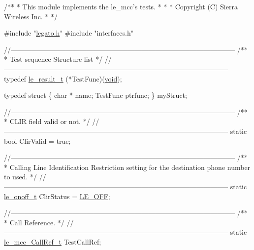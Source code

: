 
\begin{DoxyCodeInclude}
\textcolor{comment}{ /**}
\textcolor{comment}{  * This module implements the le\_mcc's tests.}
\textcolor{comment}{  *}
\textcolor{comment}{  *}
\textcolor{comment}{  * Copyright (C) Sierra Wireless Inc.}
\textcolor{comment}{  *}
\textcolor{comment}{  */}

\textcolor{preprocessor}{#include "\hyperlink{legato_8h}{legato.h}"}
\textcolor{preprocessor}{#include "interfaces.h"}


\textcolor{comment}{//--------------------------------------------------------------------------------------------------}\textcolor{comment}{}
\textcolor{comment}{/**}
\textcolor{comment}{ * Test sequence Structure list}
\textcolor{comment}{ */}
\textcolor{comment}{//--------------------------------------------------------------------------------------------------}
\textcolor{keyword}{typedef} \hyperlink{le__basics_8h_a1cca095ed6ebab24b57a636382a6c86c}{le\_result\_t} (*TestFunc)(\hyperlink{_t_e_m_p_l_a_t_e__interface_8h_ac9c84fa68bbad002983e35ce3663c686}{void});

\textcolor{keyword}{typedef} \textcolor{keyword}{struct}
\{
        \textcolor{keywordtype}{char} * name;
        TestFunc ptrfunc;
\} myStruct;

\textcolor{comment}{//--------------------------------------------------------------------------------------------------}\textcolor{comment}{}
\textcolor{comment}{/**}
\textcolor{comment}{ * CLIR field valid or not.}
\textcolor{comment}{ */}
\textcolor{comment}{//--------------------------------------------------------------------------------------------------}
\textcolor{keyword}{static} \textcolor{keywordtype}{bool} ClirValid = \textcolor{keyword}{true};

\textcolor{comment}{//--------------------------------------------------------------------------------------------------}\textcolor{comment}{}
\textcolor{comment}{/**}
\textcolor{comment}{ * Calling Line Identification Restriction setting for the destination phone number to used.}
\textcolor{comment}{ */}
\textcolor{comment}{//--------------------------------------------------------------------------------------------------}
\textcolor{keyword}{static} \hyperlink{le__basics_8h_ae2138c90c41d30e2d510be01d8b374da}{le\_onoff\_t} ClirStatus = \hyperlink{le__basics_8h_ae2138c90c41d30e2d510be01d8b374daa66236546b5af0328d2db0e6970f67e50}{LE\_OFF};

\textcolor{comment}{//--------------------------------------------------------------------------------------------------}\textcolor{comment}{}
\textcolor{comment}{/**}
\textcolor{comment}{ * Call Reference.}
\textcolor{comment}{ */}
\textcolor{comment}{//--------------------------------------------------------------------------------------------------}
\textcolor{keyword}{static} \hyperlink{le__mcc__interface_8h_a8ae6dac3ca12854884d63e17d5388a7a}{le\_mcc\_CallRef\_t} TestCallRef;


\end{DoxyCodeInclude}
